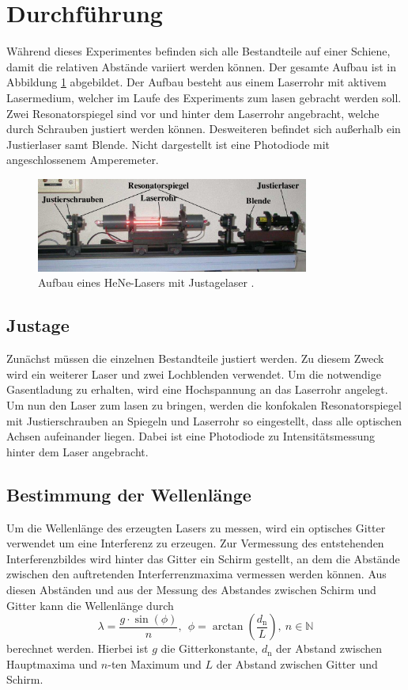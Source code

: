 \newpage
\section{Durchführung}
\label{sec:Durchführung}
Während dieses Experimentes befinden sich alle Bestandteile auf einer Schiene,
damit die relativen Abstände variiert werden können. Der gesamte Aufbau ist in
Abbildung \ref{fig:Versuchsaufbau1} abgebildet. Der Aufbau besteht aus einem
Laserrohr mit aktivem Lasermedium, welcher im Laufe des Experiments zum lasen gebracht werden soll.
Zwei Resonatorspiegel sind vor und hinter dem Laserrohr angebracht, welche durch
Schrauben justiert werden können. Desweiteren befindet sich außerhalb ein
Justierlaser samt Blende. Nicht dargestellt ist eine Photodiode mit angeschlossenem
Amperemeter.
\begin{figure}[htb]
  \centering
  \includegraphics[width=0.8\textwidth]{content/aufbau.png}
  \caption{Aufbau eines HeNe-Lasers mit Justagelaser \cite{anleitung}.}
  \label{fig:Versuchsaufbau1}
\end{figure}
\FloatBarrier

\subsection{Justage}

Zunächst müssen die einzelnen Bestandteile justiert werden.
Zu diesem Zweck wird ein weiterer Laser und zwei Lochblenden verwendet.
Um die notwendige Gasentladung zu erhalten, wird eine Hochspannung an das Laserrohr
angelegt. Um nun den Laser zum lasen zu bringen, werden die konfokalen
Resonatorspiegel mit Justierschrauben an Spiegeln und Laserrohr so eingestellt,
dass alle optischen Achsen aufeinander liegen. Dabei ist eine Photodiode zu
Intensitätsmessung hinter dem Laser angebracht.

\subsection{Bestimmung der Wellenlänge}
Um die Wellenlänge
des erzeugten Lasers zu messen, wird ein optisches Gitter verwendet um eine
Interferenz zu erzeugen.
Zur Vermessung des entstehenden Interferenzbildes wird hinter das Gitter ein
Schirm gestellt, an dem die Abstände zwischen den auftretenden
Interferrenzmaxima vermessen werden können. Aus diesen Abständen und aus der
Messung des Abstandes zwischen Schirm und Gitter kann die Wellenlänge durch
\begin{equation}
  \lambda = \frac{g\cdot\sin(\phi)}{n},\ \ \phi = \arctan\left(\frac{d_\text{n}}{L}\right),\  n\in\mathds{N}
  \label{eqn:welle}
\end{equation}
berechnet werden. Hierbei ist $g$ die Gitterkonstante, $d_\text{n}$ der Abstand
zwischen Hauptmaxima und $n$-ten Maximum und $L$ der Abstand zwischen Gitter und
Schirm.

